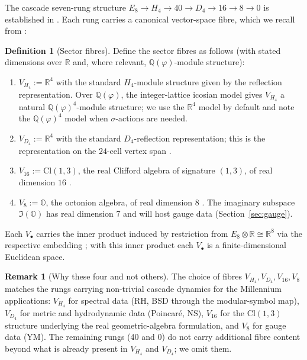 \documentclass[11pt, a4paper]{amsart}
\theoremstyle{definition}
\newtheorem{definition}[theorem]{Definition}
\newtheorem{remark}[theorem]{Remark}
\newcommand{\R}{\mathbb{R}}
\newcommand{\Q}{\mathbb{Q}}
\newcommand{\OO}{\mathbb{O}}
\newcommand{\pphi}{\varphi}
\begin{document}
The cascade seven-rung structure
$E_8 \to H_4 \to 40 \to D_4 \to 16 \to 8 \to 0$ is established in
\cite[\S F3]{CascadeFoundations}. Each rung carries a canonical
vector-space fibre, which we recall from
\cite[\S\S 2--6]{CascadeEmbeddings}:

\begin{definition}[Sector fibres]
\label{def:fibres}
Define the sector fibres as follows (with stated dimensions over $\R$
and, where relevant, $\Q(\pphi)$-module structure):
\begin{enumerate}
\item $V_{H_4} := \R^4$ with the standard $H_4$-module structure
  given by the reflection representation. Over $\Q(\pphi)$, the
  integer-lattice icosian model
  \cite[\S 3.1]{CascadeEmbeddings} gives $V_{H_4}$ a natural
  $\Q(\pphi)^4$-module structure; we use the $\R^4$ model by
  default and note the $\Q(\pphi)^4$ model when $\sigma$-actions
  are needed.
\item $V_{D_4} := \R^4$ with the standard $D_4$-reflection
  representation; this is the representation on the $24$-cell
  vertex span \cite[\S 2]{CascadeEmbeddings}.
\item $V_{16} := \mathrm{Cl}(1,3)$, the real Clifford algebra of
  signature $(1, 3)$, of real dimension $16$
  \cite[\S 5.1]{CascadeEmbeddings}.
\item $V_{8} := \OO$, the octonion algebra, of real dimension
  $8$ \cite[\S 6]{CascadeEmbeddings}. The imaginary subspace
  $\Im(\OO)$ has real dimension $7$ and will host gauge data
  (Section~\ref{sec:gauge}).
\end{enumerate}
Each $V_\bullet$ carries the inner product induced by restriction
from $E_8 \otimes \R \cong \R^8$ via the respective embedding
\cite[\S\S 2--6]{CascadeEmbeddings}; with this inner product each
$V_\bullet$ is a finite-dimensional Euclidean space.
\end{definition}

\begin{remark}[Why these four and not others]
The choice of fibres $V_{H_4}, V_{D_4}, V_{16}, V_8$ matches the
rungs carrying non-trivial cascade dynamics for the Millennium
applications: $V_{H_4}$ for spectral data (RH, BSD through the
modular-symbol map), $V_{D_4}$ for metric and hydrodynamic data
(Poincar\'e, NS), $V_{16}$ for the $\mathrm{Cl}(1,3)$ structure
underlying the real geometric-algebra formulation, and $V_8$ for
gauge data (YM). The remaining rungs (40 and 0) do not carry
additional fibre content beyond what is already present in
$V_{H_4}$ and $V_{D_4}$; we omit them.
\end{remark}
\end{document}
